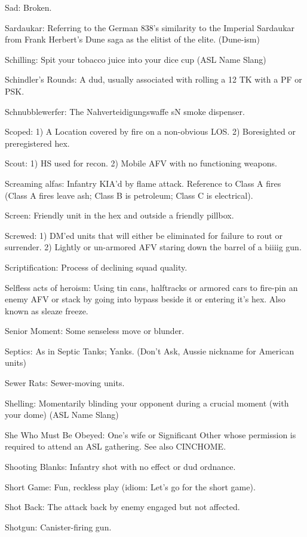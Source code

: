 \documentclass[letterpaper]{article}
\begin{document}
Sad: Broken.

Sardaukar: Referring to the German 838's similarity to the Imperial Sardaukar from Frank Herbert's Dune saga as the elitist of the elite. (Dune-ism)

Schilling: Spit your tobacco juice into your dice cup (ASL Name Slang)

Schindler's Rounds: A dud, usually associated with rolling a 12 TK with a PF or PSK.

Schnubblewerfer: The Nahverteidigungswaffe sN smoke dispenser.

Scoped: 1) A Location covered by fire on a non-obvious LOS. 2) Boresighted or preregistered hex.

Scout: 1) HS used for recon. 2) Mobile AFV with no functioning weapons.

Screaming alfas: Infantry KIA'd by flame attack.  Reference to Class A fires (Class A fires leave ash; Class B is petroleum; Class C is electrical).

Screen: Friendly unit in the hex and outside a friendly pillbox.

Screwed: 1) DM'ed units that will either be eliminated for failure to rout or surrender. 2) Lightly or un-armored AFV staring down the barrel of a biiiig gun.

Scriptification: Process of declining squad quality.

Selfless acts of heroism: Using tin cans, halftracks or armored cars to fire-pin an enemy AFV or stack by going into bypass beside it or entering it's hex. Also known as sleaze freeze.

Senior Moment: Some senseless move or blunder.

Septics: As in Septic Tanks; Yanks. (Don't Ask, Aussie nickname for American units)

Sewer Rats: Sewer-moving units.

Shelling: Momentarily blinding your opponent during a crucial moment (with your dome) (ASL Name Slang)

She Who Must Be Obeyed: One's wife or Significant Other whose permission is required to attend an ASL gathering. See also CINCHOME.

Shooting Blanks: Infantry shot with no effect or dud ordnance.

Short Game: Fun, reckless play (idiom:  Let's go for the short game).

Shot Back: The attack back by enemy engaged but not affected.

Shotgun: Canister-firing gun.
\end{document}
